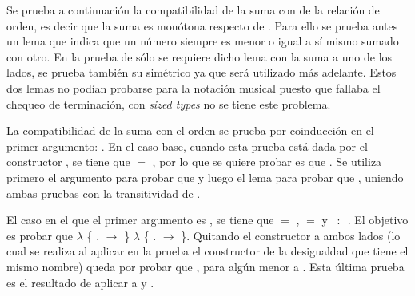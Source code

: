 Se prueba a continuación la compatibilidad de la suma con de la relación de orden, es decir que la suma es monótona respecto de \AgdaFunction{$\leq$}. Para ello se prueba antes un lema que indica que un número siempre es menor o igual a sí mismo sumado con otro. En la prueba de  sólo se requiere dicho lema con la suma a uno de los lados, se prueba también su simétrico ya que será utilizado más adelante. Estos dos lemas no podían probarse para la notación musical puesto que fallaba el chequeo de terminación, con \textit{sized types} no se tiene este problema.

La compatibilidad de la suma con el orden se prueba por coinducción en el primer argumento:  \AgdaFunction{$\leq$} . En el caso base, cuando esta prueba está dada por el constructor , se tiene que  $=$ , por lo que se quiere probar es que  \AgdaFunction{$\leq$}  \AgdaFunction{+} . Se utiliza primero el argumento  para probar que  \AgdaFunction{$\leq$}  y luego el lema  para probar que  \AgdaFunction{$\leq$}  \AgdaFunction{+} , uniendo ambas pruebas con la transitividad de \AgdaFunction{$\leq$}. 

El caso en el que el primer argumento es  , se tiene que  $=$  ,  $=$   y \hbox{ $:$ \AgdaFunction{[}  \AgdaFunction{]}     }. El objetivo es probar que \AgdaFunction{[}  \AgdaFunction{]}  $\lambda$ \{ $.$ $\rightarrow$   \AgdaFunction{+}  \} \AgdaFunction{$\leq$}  $\lambda$ \{ $.$ $\rightarrow$   \AgdaFunction{+}  \}. Quitando el constructor  a ambos lados (lo cual se realiza al aplicar en la prueba el constructor de la desigualdad que tiene el mismo nombre) queda por probar que \AgdaFunction{[}  \AgdaFunction{]}   \AgdaFunction{+}  \AgdaFunction{$\leq$}   \AgdaFunction{+} , para algún  menor a . Esta última prueba es el resultado de aplicar  a   y .

